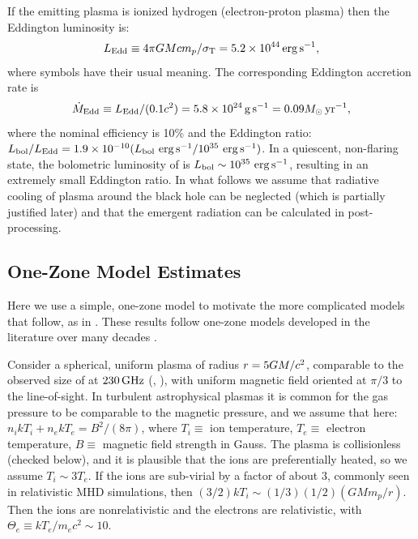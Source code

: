 If the emitting plasma is ionized hydrogen (electron-proton plasma) then the Eddington luminosity is:
\begin{equation}
L_\mathrm{Edd} \equiv 4\pi G\mbh c m_p/\sigma_\mathrm{T} = 5.2 \times 10^{44}\erg \sec^{-1},
\end{equation}
where symbols have their usual meaning.
The corresponding Eddington accretion rate is
\begin{equation}
\dot\mbh_\mathrm{Edd} \equiv L_\mathrm{Edd}/(0.1 c^2) = 5.8 \times 10^{24} \gm \sec^{-1} = 0.09 \msun \yr^{-1},
\end{equation}
where the nominal efficiency is 10\% and the Eddington ratio:
$L_\mathrm{bol}/L_\mathrm{Edd} = 1.9 \times 10^{-10} (L_\mathrm{bol} \,\,\mathrm{erg}\,\mathrm{s}^{-1} /10^{35} \,\,\mathrm{erg}\,\mathrm{s}^{-1})$.
In a quiescent, non-flaring state, the bolometric luminosity of \sgra is $L_\mathrm{bol} \sim 10^{35}\,\,\mathrm{erg}\,\mathrm{s}^{-1}$, resulting in an extremely small Eddington ratio.
In what follows we assume that radiative cooling of plasma around the black hole can be neglected (which is partially justified later) and that the emergent radiation can be calculated in post-processing.

\subsection{One-Zone Model Estimates}

Here we use a simple, one-zone model to motivate the more complicated models that follow, as in .  These results follow one-zone models developed in the literature over many decades \citep[e.g.][]{1996IAUS..169..169F}.

Consider a spherical, uniform plasma of radius $r = 5GM/c^2$, comparable to the observed size of \sgra at $230\,\mathrm{GHz}$ (, ), with uniform magnetic field oriented at $\pi/3$ to the line-of-sight.  In turbulent astrophysical plasmas it is common for  the gas pressure to be comparable to the magnetic pressure, and we assume that here: $n_i k T_i + n_e k T_e = B^2/(8\pi)$, where $T_i \equiv$ ion temperature, $T_e \equiv$ electron temperature, $B \equiv$ magnetic field strength in Gauss.  The plasma is collisionless (checked below), and it is plausible that the ions are preferentially heated, so we assume $T_i \sim 3 T_e$.  If the ions are sub-virial by a factor of about $3$, commonly seen in relativistic MHD simulations, then $(3/2) k T_i \sim (1/3) (1/2) (G M m_p/r)$.  Then the ions are nonrelativistic and the electrons are relativistic, with $\Theta_e \equiv  k T_e / m_e c^2 \sim 10$. 

